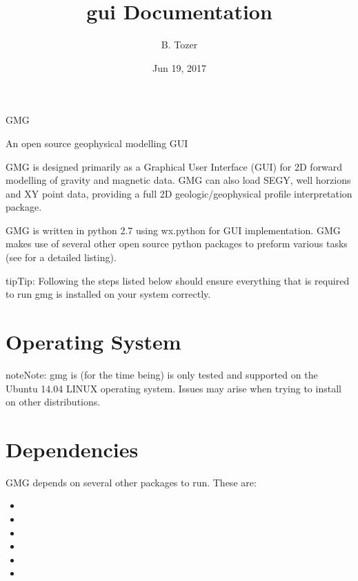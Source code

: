 \documentclass[a4paper,12pt,english]{sphinxmanual}
\title{gui Documentation}
\date{Jun 19, 2017}
\author{B. Tozer}
\begin{document}
\maketitle
\sphinxtableofcontents
{}\label{\detokenize{documentation_home::doc}}


GMG

An open source geophysical modelling GUI



GMG is designed primarily as a Graphical User Interface (GUI) for 2D forward modelling of gravity and magnetic data.
GMG can also load SEGY, well horzions and XY point data, providing a full 2D geologic/geophysical profile interpretation
package.

GMG is written in python 2.7 using wx.python for GUI implementation. GMG makes use of several other open source python
packages to preform various tasks (see  for a detailed listing).





\begin{sphinxadmonition}{tip}{Tip:}
Following the steps listed below should ensure everything that is required to run gmg is installed on your system correctly.
\end{sphinxadmonition}


\chapter{Operating System}
\label{\detokenize{installation:installation}}\label{\detokenize{installation::doc}}\label{\detokenize{installation:operating-system}}\label{\detokenize{installation:id1}}
\begin{sphinxadmonition}{note}{Note:}
gmg is (for the time being) is only tested and supported on the Ubuntu 14.04 LINUX operating system.
Issues may arise when trying to install on other distributions.
\end{sphinxadmonition}


\chapter{Dependencies}
\label{\detokenize{installation:dependencies}}
GMG depends on several other packages to run. These are:
\begin{itemize}
\item {} 

\item {} 

\item {} 

\item {} 

\item {} 

\item {} 

\end{itemize}
\end{document}
